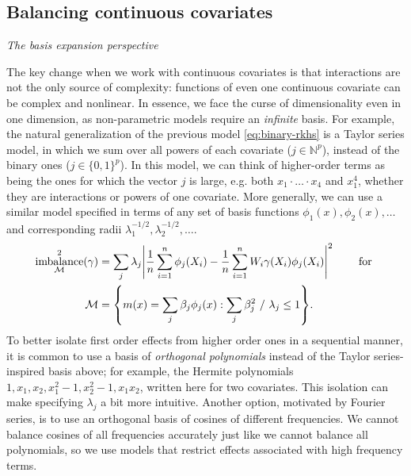 \documentclass{article}
\newcommand{\subsubsection}[1]{\par\noindent\textit{#1}\enspace}
\DeclarePairedDelimiter\abs{\lvert}{\rvert}
\DeclarePairedDelimiter\set{\{}{\}}
\theoremstyle{definition}
\newcommand{\calM}{\ensuremath{\mathcal{M}}}
\DeclareMathOperator{\imbalance}{imbalance}
\newcommand{\model}{\mathcal{M}}
\newcommand{\<}{\langle}
\renewcommand{\>}{\rangle}
\newcommand\cmnt[2]{\;
{\textcolor{red}{[{\em #1 --- #2}] \;}
}}
\newcommand\avi[1]{\cmnt{#1}{Avi}}
\begin{document}

\subsection{Balancing continuous covariates}
\label{sec:balancing-continuous-covariates}



\subsubsection{The basis expansion perspective}

The key change when we work with continuous covariates is that interactions are not the only source of complexity: functions of even one continuous covariate can be complex and nonlinear. In essence, we face the curse of dimensionality even in one dimension, as non-parametric models require an \emph{infinite} basis. For example, the natural generalization of the previous model \eqref{eq:binary-rkhs} is a Taylor series model, in which we sum over all powers of each covariate ($j \in \mathbb{N}^p$), instead of the binary ones ($j \in \{0,1\}^p$). In this model, we can think of higher-order terms as being the ones for which the vector $j$ is large, e.g. both $x_1 \cdot \ldots \cdot x_4$ and $x_1^4$, whether they are interactions or powers of one covariate.
More generally, we can use a similar model specified in terms of any set of basis functions $\phi_1(x),\phi_2(x),\ldots$ and corresponding radii $\lambda_1^{-1/2},\lambda_2^{-1/2},\ldots$.
\begin{equation}
    \label{eq:imbalance_phi_infinite}
\begin{aligned}
    \imbalance^2_{\calM}(\gamma) &= \sum_j \lambda_j \abs*{\frac{1}{n}\sum_{i=1}^n \phi_j(X_i) - \frac{1}{n}\sum_{i=1}^n W_i \gamma(X_i) \phi_j(X_i)}^2 \qquad \text{ for } \\
    \model &= \set*{m(x) = \sum_j \beta_{j} \phi_j(x) : \sum_j \beta_j^2 \ / \ \lambda_j \le 1}.
\end{aligned}
\end{equation}
To better isolate first order effects from higher order ones in a sequential manner, it is common to use a basis of \emph{orthogonal polynomials}
instead of the Taylor series-inspired basis above; for example, the Hermite polynomials $1,x_1,x_2,x_1^2-1,x_2^2-1,x_1x_2$, written here for two covariates.
This isolation can make specifying  $\lambda_j$ a bit more intuitive.
Another option, motivated by Fourier series, is to use an orthogonal basis of cosines of different frequencies. We cannot balance cosines of all frequencies accurately just like we cannot balance all polynomials, so we use models that restrict effects associated with high frequency terms.
\end{document}
